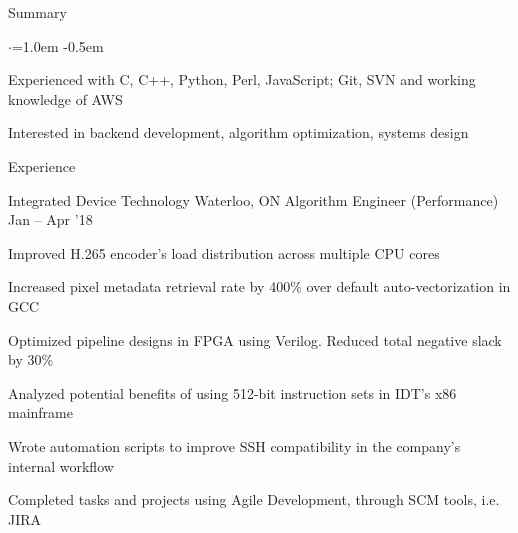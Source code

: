 \documentclass{resume} %
\begin{document}

\begin{rSection}{Summary}
  \vspace{0.5em}
  \begin{list}{$\cdot$}{\leftmargin=1.0em}
    \itemsep -0.5em \vspace{-0.5em}
    \item Experienced with C, C++, Python, Perl, JavaScript; Git, SVN and working knowledge of AWS
	\item Interested in backend development, algorithm optimization, systems design
  \end{list}
  \vspace{0.5em}
\end{rSection}


\begin{rSection}{Experience}
  \begin{rWorkSection}{Integrated Device Technology}
                     {Waterloo, ON}
                     {Algorithm Engineer (Performance)}
                     {Jan -- Apr '18}
    \item Improved H.265 encoder's load distribution across multiple CPU cores
    \item Increased pixel metadata retrieval rate by 400\% over default 
	  auto-vectorization in GCC
    \item Optimized pipeline designs in FPGA using Verilog. Reduced total
	  negative slack by 30\%
	  \item Analyzed potential benefits of using 512-bit instruction sets in 
	  IDT's x86 mainframe
    \item Wrote automation scripts to improve SSH compatibility in the
	  company's internal workflow
	  \item Completed tasks and projects using Agile Development, through SCM 
    tools, i.e. JIRA
  \end{rWorkSection}
\end{rSection}
\end{document}
